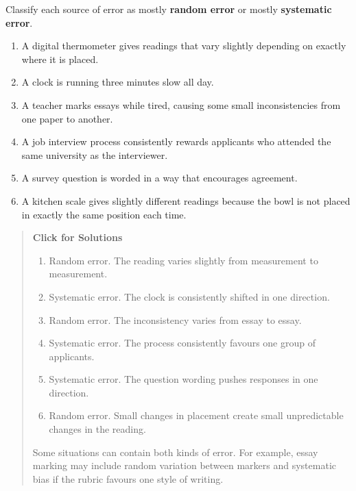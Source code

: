 \documentclass[
  letterpaper,
  DIV=11,
  numbers=noendperiod]{scrreprt}
\begin{document}
\begin{tcolorbox}[enhanced jigsaw, arc=.35mm, bottomrule=.15mm, bottomtitle=1mm, breakable, colback=white, colbacktitle=quarto-callout-note-color!10!white, colframe=quarto-callout-note-color-frame, coltitle=black, left=2mm, leftrule=.75mm, opacityback=0, opacitybacktitle=0.6, rightrule=.15mm, title=\textcolor{quarto-callout-note-color}{\faInfo}\hspace{0.5em}{Question 2}, titlerule=0mm, toprule=.15mm, toptitle=1mm]

Classify each source of error as mostly \textbf{random error} or mostly
\textbf{systematic error}.

\begin{enumerate}
\def\labelenumi{\alph{enumi}.}
\item
  A digital thermometer gives readings that vary slightly depending on
  exactly where it is placed.
\item
  A clock is running three minutes slow all day.
\item
  A teacher marks essays while tired, causing some small inconsistencies
  from one paper to another.
\item
  A job interview process consistently rewards applicants who attended
  the same university as the interviewer.
\item
  A survey question is worded in a way that encourages agreement.
\item
  A kitchen scale gives slightly different readings because the bowl is
  not placed in exactly the same position each time.
\end{enumerate}

\begin{quote}
\textbf{Click for Solutions}

\begin{enumerate}
\def\labelenumi{\alph{enumi}.}
\item
  Random error. The reading varies slightly from measurement to
  measurement.
\item
  Systematic error. The clock is consistently shifted in one direction.
\item
  Random error. The inconsistency varies from essay to essay.
\item
  Systematic error. The process consistently favours one group of
  applicants.
\item
  Systematic error. The question wording pushes responses in one
  direction.
\item
  Random error. Small changes in placement create small unpredictable
  changes in the reading.
\end{enumerate}

Some situations can contain both kinds of error. For example, essay
marking may include random variation between markers and systematic bias
if the rubric favours one style of writing.
\end{quote}

\end{tcolorbox}
\end{document}
